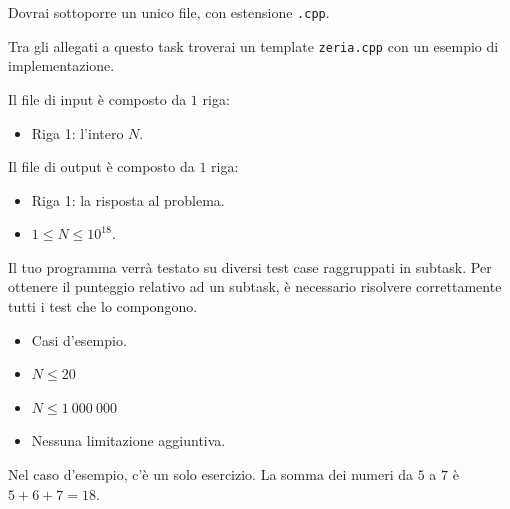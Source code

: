 \Implementation

Dovrai sottoporre un unico file, con estensione \texttt{.cpp}.

\begin{warning}
    Tra gli allegati a questo task troverai un template \texttt{zeria.cpp} con un esempio di implementazione.
\end{warning}

Il file di input è composto da $1$ riga:
\begin{itemize}
    \item Riga 1: l'intero $N$.
\end{itemize}

Il file di output è composto da $1$ riga:
\begin{itemize}
    \item Riga 1: la risposta al problema.
\end{itemize}


\Constraints

\begin{itemize}[nolistsep, itemsep=2mm]
    \item $1 \le N \le 10^{18}$.
\end{itemize}


\Scoring

Il tuo programma verrà testato su diversi test case raggruppati in subtask.
Per ottenere il punteggio relativo ad un subtask,
è necessario risolvere correttamente tutti i test che lo compongono.

\begin{itemize}[nolistsep,itemsep=2mm]
    \item \subtask Casi d'esempio.
    \item \subtask $N  \le 20$
    \item \subtask $N \le 1\:000\:000$
    \item \subtask Nessuna limitazione aggiuntiva.
\end{itemize}


\Examples

\begin{example}
\end{example}


\Explanation

Nel caso d'esempio, c'è un solo esercizio. La somma dei numeri da $5$ a $7$ è $5+6+7 = 18$.
